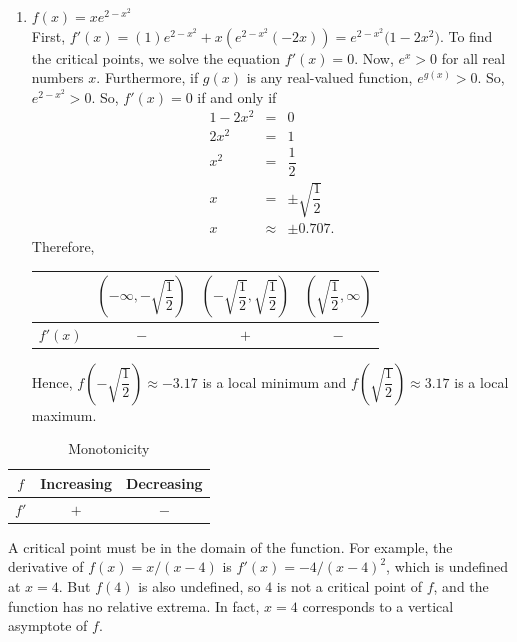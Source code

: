 \documentclass{book}
\begin{document}
\begin{Exam}
\begin{enumerate}
\item $f(x) = xe^{2-x^2}$\\

First, $f'(x) = (1)e^{2-x^2} + x(e^{2-x^2}(-2x)) = e^{2-x^2}\big(1 - 2x^2\big)$. To find the critical points, we solve the equation $f'(x) = 0$.  Now, $e^x > 0$ for all real numbers $x$. Furthermore, if $g(x)$ is any real-valued function, $e^{g(x)} > 0$. So, $e^{2-x^2} > 0$. So, $f'(x) = 0$ if and only if \begin{eqnarray*}
1-2x^2 &=& 0\\
2x^2 &=& 1\\ 
x^2 &=& \dfrac{1}{2}\\
  x &=& \pm\sqrt{\dfrac{1}{2}}\\
x& \approx& \pm 0.707.
\end{eqnarray*} Therefore, \begin{center}
\begin{tabular}{c|c|c|c}
 & $\left(-\infty, -\sqrt{\dfrac{1}{2}}\right)$ & $\left(-\sqrt{\dfrac{1}{2}},\sqrt{\dfrac{1}{2}}\right)$ & $\left(\sqrt{\dfrac{1}{2}}, \infty\right)$ \\ \hline
$f'(x)$ & $-$ & $+$ & $-$ \\ %
\end{tabular}
\end{center}\vspace{0.1 in} Hence, $f\left(-\sqrt{\dfrac{1}{2}}\right) \approx -3.17$ is a local minimum and $f\left(\sqrt{\dfrac{1}{2}}\right) \approx 3.17$ is a local maximum. 
\end{enumerate}
\end{Exam}

\begin{table}[h]
  \centering
  \caption{Monotonicity}
    \begin{tabular}{c|c|c}
    $f$   & Increasing & Decreasing \\  \hline
    $f'$  & $+$   & $-$ \\
    \end{tabular}%
  \label{tab:addlabel}%
\end{table}%



A critical point must be in the domain of the function. For example, the derivative of $f(x) = x/(x-4)$ is $f'(x) = -4/(x-4)^2$, which is undefined at $x=4$. But $f(4)$ is also undefined, so $4$ is not a critical point of $f$, and the function has no relative extrema. In fact, $x=4$ corresponds to a vertical asymptote of $f$. 
\end{document}
